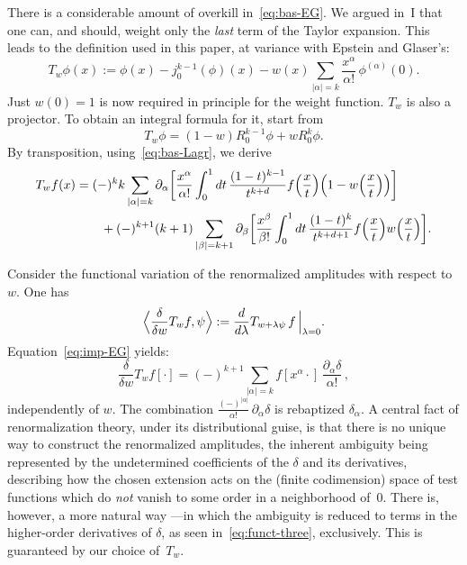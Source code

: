 \documentclass[a4paper,12pt]{article}
\renewcommand{\a}{\alpha}          %
\renewcommand{\b}{\beta}           %
\newcommand{\del}{\partial}        %
\newcommand{\dl}{\delta}           %
\newcommand{\la}{\lambda}          %
\newcommand{\nn}{\nonumber}        %
\newcommand{\7}{\dagger}           %
\theoremstyle{plain}
\theoremstyle{definition}
\begin{document}
\smallskip

There is a considerable amount of overkill in~\eqref{eq:bas-EG}. We
argued in~I that one can, and should, weight only the \textit{last}
term of the Taylor expansion. This leads to the definition used in
this paper, at variance with Epstein and Glaser's:
\begin{equation}
T_w\phi(x) :=  \phi(x) - j^{k-1}_0(\phi)(x) - w(x) \sum_{|\a|= k}
\frac{x^{\a}}{\a!} \, \phi^{(\a)} (0).
\label{eq:imp-EG}
\end{equation}
Just $w(0) = 1$ is now required in principle for the weight function.
$T_w$ is also a projector. To obtain an integral formula for it, start
from
$$
T_w\phi = (1-w) R^{k-1}_0\phi + w R^k_0\phi.
$$
By transposition, using~\eqref{eq:bas-Lagr}, we derive
\begin{align}
T_w f(x)
&= (-)^{k} k \sum_{|\a|=k} \del_\a \biggl[ \frac{x^\a}{\a!}
\int_0^1 dt\, \frac{(1-t)^{k-1}}{t^{k+d}} f\Bigl(\frac{x}{t}\Bigr)
\Bigl(1-w\Bigl(\frac{x}{t}\Bigr)\Bigr)\biggr]
\nn \\
&\qquad + (-)^{k+1} (k+1)
\sum_{|\b|=k+1} \del_\b \biggl[ \frac{x^\b}{\b!}
\int_0^1 dt\, \frac{(1-t)^k}{t^{k+d+1}} f\Bigl(\frac{x}{t}\Bigr)
w\Bigl(\frac{x}{t}\Bigr) \biggr].
\label{eq:tapadelperol}
\end{align}

Consider the functional variation of the renormalized amplitudes with
respect to~$w$. One has
$$
\Bigl< \frac{\dl}{\dl w}T_w f, \psi \Bigr> :=
\frac{d}{d\la} T_{w+\la\psi}\,f\,\Bigr|_{\la=0}.
$$
Equation~\eqref{eq:imp-EG} yields:
\begin{equation}
\frac{\dl}{\dl w}T_w f[\cdot] = (-)^{k+1}
\sum_{|\a| = k} f[x^\a\cdot]\, \frac{\del_\a\dl}{\a!}\,,
\label{eq:funct-three}
\end{equation}
independently of $w$. The combination
$\frac{(-)^{|\a|}}{\a!}\,\del_\a\dl$ is rebaptized $\dl_\a$. A central
fact of renormalization theory, under its distributional guise, is
that there is no unique way to construct the renormalized amplitudes,
the inherent ambiguity being represented by the undetermined
coefficients of the $\delta$ and its derivatives, describing how the
chosen extension acts on the (finite codimension) space of test
functions which do \textit{not} vanish to some order in a neighborhood
of~$0$. There is, however, a more natural way ---in which the
ambiguity is reduced to terms in the higher-order derivatives of
$\delta$, as seen in~\eqref{eq:funct-three}, exclusively. This is
guaranteed by our choice of~$T_w$.
\end{document}

